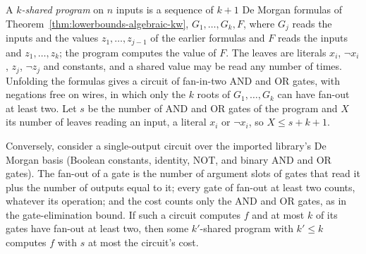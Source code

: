 \begin{theorem}
  \label{thm:lowerbounds-algebraic-khrapchenko-shared}
  \leanok
  A \emph{$k$-shared program} on $n$ inputs is a sequence of $k + 1$ De Morgan
  formulas of Theorem~\ref{thm:lowerbounds-algebraic-kw}, $G_1, \dots, G_k, F$,
  where $G_j$ reads the inputs and the values $z_1, \dots, z_{j-1}$ of the
  earlier formulas and $F$ reads the inputs and $z_1, \dots, z_k$; the program
  computes the value of $F$. The leaves are literals $x_i$, $\neg x_i$, $z_j$,
  $\neg z_j$ and constants, and a shared value may be read any number of times.
  Unfolding the formulas gives a circuit of fan-in-two AND and OR gates, with
  negations free on wires, in which only the $k$ roots of $G_1, \dots, G_k$ can
  have fan-out at least two. Let $s$ be the number of AND and OR gates of the
  program and $X$ its number of leaves reading an input, a literal $x_i$ or
  $\neg x_i$, so $X \le s + k + 1$.

  Conversely, consider a single-output circuit over the imported library's
  De Morgan basis (Boolean constants, identity, NOT, and binary AND and OR
  gates). The fan-out of a gate is the number of argument slots of gates that
  read it plus the number of outputs equal to it; every gate of fan-out at least
  two counts, whatever its operation; and the cost counts only the AND and OR
  gates, as in the gate-elimination bound. If such a circuit computes $f$ and
  at most $k$ of its gates have fan-out at least two, then some $k'$-shared
  program with $k' \le k$ computes $f$ with $s$ at most the circuit's cost.


\end{theorem}
